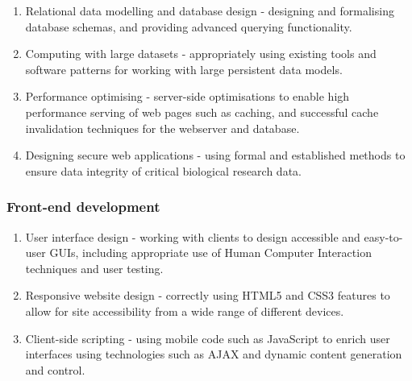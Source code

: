 \begin{enumerate}
\item Relational data modelling and database design - designing and formalising
  database schemas, and providing advanced querying functionality.
\item Computing with large datasets - appropriately using existing tools and
  software patterns for working with large persistent data models.
\item Performance optimising - server-side optimisations to enable high
  performance serving of web pages such as caching, and successful cache
  invalidation techniques for the webserver and database.
\item Designing secure web applications - using formal and established methods
  to ensure data integrity of critical biological research data.
\end{enumerate}

\subsubsection{Front-end development}
\begin{enumerate}
\item User interface design - working with clients to design accessible and
  easy-to-user GUIs, including appropriate use of Human Computer Interaction
  techniques and user testing.
\item Responsive website design - correctly using HTML5 and CSS3 features to
  allow for site accessibility from a wide range of different devices.
\item Client-side scripting - using mobile code such as JavaScript to enrich
  user interfaces using technologies such as AJAX and dynamic content generation
  and control.
\end{enumerate}
